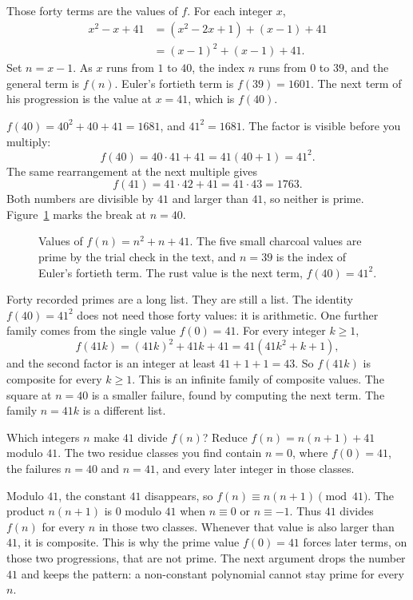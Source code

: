 Those forty terms are the values of $f$. For each integer $x$,
\begin{align*}
x^2-x+41
&=(x^2-2x+1)+(x-1)+41\\
&=(x-1)^2+(x-1)+41.
\end{align*}
Set $n=x-1$. As $x$ runs from $1$ to $40$, the index $n$ runs from $0$ to $39$, and the general term is $f(n)$. Euler's fortieth term is $f(39)=1601$. The next term of his progression is the value at $x=41$, which is $f(40)$.

\begin{examplex}
$f(40)=40^2+40+41=1681$, and $41^2=1681$. The factor is visible before you multiply:
\[
f(40)=40\cdot41+41=41(40+1)=41^2.
\]
The same rearrangement at the next multiple gives
\[
f(41)=41\cdot42+41=41\cdot43=1763.
\]
Both numbers are divisible by $41$ and larger than $41$, so neither is prime. Figure~\ref{fig:field-euler} marks the break at $n=40$.
\end{examplex}

\begin{figure}[ht]
\centering
{}
\caption{Values of $f(n)=n^2+n+41$. The five small charcoal values are prime by the trial check in the text, and $n=39$ is the index of Euler's fortieth term. The rust value is the next term, $f(40)=41^2$.}
\label{fig:field-euler}
\end{figure}

Forty recorded primes are a long list. They are still a list. The identity $f(40)=41^2$ does not need those forty values: it is arithmetic. One further family comes from the single value $f(0)=41$. For every integer $k\ge1$,
\[
f(41k)=(41k)^2+41k+41=41(41k^2+k+1),
\]
and the second factor is an integer at least $41+1+1=43$. So $f(41k)$ is composite for every $k\ge1$. This is an infinite family of composite values. The square at $n=40$ is a smaller failure, found by computing the next term. The family $n=41k$ is a different list.

\begin{think}
Which integers $n$ make $41$ divide $f(n)$? Reduce $f(n)=n(n+1)+41$ modulo $41$. The two residue classes you find contain $n=0$, where $f(0)=41$, the failures $n=40$ and $n=41$, and every later integer in those classes.
\end{think}

Modulo $41$, the constant $41$ disappears, so $f(n)\equiv n(n+1)\pmod{41}$. The product $n(n+1)$ is $0$ modulo $41$ when $n\equiv0$ or $n\equiv-1$. Thus $41$ divides $f(n)$ for every $n$ in those two classes. Whenever that value is also larger than $41$, it is composite. This is why the prime value $f(0)=41$ forces later terms, on those two progressions, that are not prime. The next argument drops the number $41$ and keeps the pattern: a non-constant polynomial cannot stay prime for every $n$.

